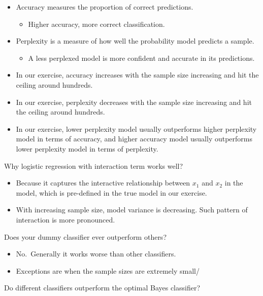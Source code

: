 \documentclass[
]{article}
\providecommand{\tightlist}{%
  \setlength{\itemsep}{0pt}\setlength{\parskip}{0pt}}
\begin{document}
\begin{itemize}
\item
  Accuracy measures the proportion of correct predictions.

  \begin{itemize}
  \tightlist
  \item
    Higher accuracy, more correct classification.
  \end{itemize}
\item
  Perplexity is a measure of how well the probability model predicts a
  sample.

  \begin{itemize}
  \tightlist
  \item
    A less perplexed model is more confident and accurate in its
    predictions.
  \end{itemize}
\item
  In our exercise, accuracy increases with the sample size increasing
  and hit the ceiling around hundreds.
\item
  In our exercise, perplexity decreases with the sample size increasing
  and hit the ceiling around hundreds.
\item
  In our exercise, lower perplexity model usually outperforms higher
  perplexity model in terms of accuracy, and higher accuracy model
  usually outperforms lower perplexity model in terms of perplexity.
\end{itemize}

Why logistic regression with interaction term works well?

\begin{itemize}
\item
  Because it captures the interactive relationship between \(x_1\) and
  \(x_2\) in the model, which is pre-defined in the true model in our
  exercise.
\item
  With increasing sample size, model variance is decreasing. Such
  pattern of interaction is more pronounced.
\end{itemize}

Does your dummy classifier ever outperform others?

\begin{itemize}
\item
  No.~Generally it works worse than other classifiers.
\item
  Exceptions are when the sample sizes are extremely small/
\end{itemize}

Do different classifiers outperform the optimal Bayes classifier?
\end{document}
